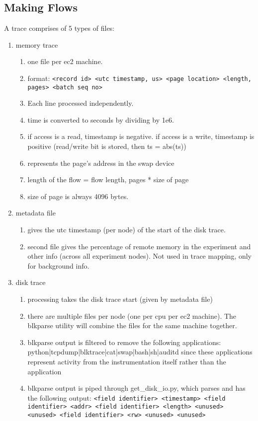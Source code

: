 \subsection{Making Flows}
A trace comprises of 5 types of files:
\begin{enumerate}
\item memory trace
    \begin{enumerate}
    \item one file per ec2 machine.
    \item format: \texttt{<record id> <utc timestamp, us> <page location> <length, pages> <batch seq no>}
    \item Each line processed independently.
    \item time is converted to seconds by dividing by 1e6.
    \item if access is a read, timestamp is negative. if access is a write, timestamp is positive (read/write bit is stored, then ts = abs(ts))
    \item <page location> represents the page's address in the swap device
    \item length of the flow = flow length, pages * size of page
    \item size of page is always 4096 bytes.
    \end{enumerate}
\item metadata file
    \begin{enumerate}
    \item gives the utc timestamp (per node) of the start of the disk trace.
    \item second file gives the percentage of remote memory in the experiment and other info (across all experiment nodes). Not used in trace mapping, only for background info.
    \end{enumerate}
\item disk trace
    \begin{enumerate}
    \item processing takes the disk trace start (given by metadata file)
    \item there are multiple files per node (one per cpu per ec2 machine). The blkparse utility will combine the files for the same machine together.
    \item blkparse output is filtered to remove the following applications: python|tcpdump|blktrace|cat|swap|bash|sh|auditd since these applications represent activity from the instrumentation itself rather than the application
    \item blkparse output is piped through get\_disk\_io.py, which parses and has the following output: \texttt{<field identifier> <timestamp> <field identifier> <addr> <field identifier> <length> <unused> <unused> <field identifier> <rw> <unused> <unused>}

\end{enumerate}
\end{enumerate}
